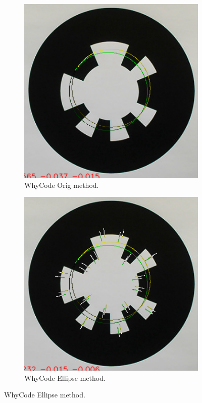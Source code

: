 \begin{figure}
    \centering
        \begin{subfigure}[b]{0.48\textwidth}
        \centering
        \includegraphics[width=\textwidth]{images/whycode_orig_both_solutions_cropped}
        \caption{WhyCode Orig method.}
        \label{figure:whycode_orig}
    \end{subfigure}
    \begin{subfigure}[b]{0.48\textwidth}
        \centering
        \includegraphics[width=\textwidth]{images/whycode_ellipse_both_solutions_cropped}
        \caption{WhyCode Ellipse method.}
        \label{figure:whycode_ellipse}
    \end{subfigure}
\end{figure}

